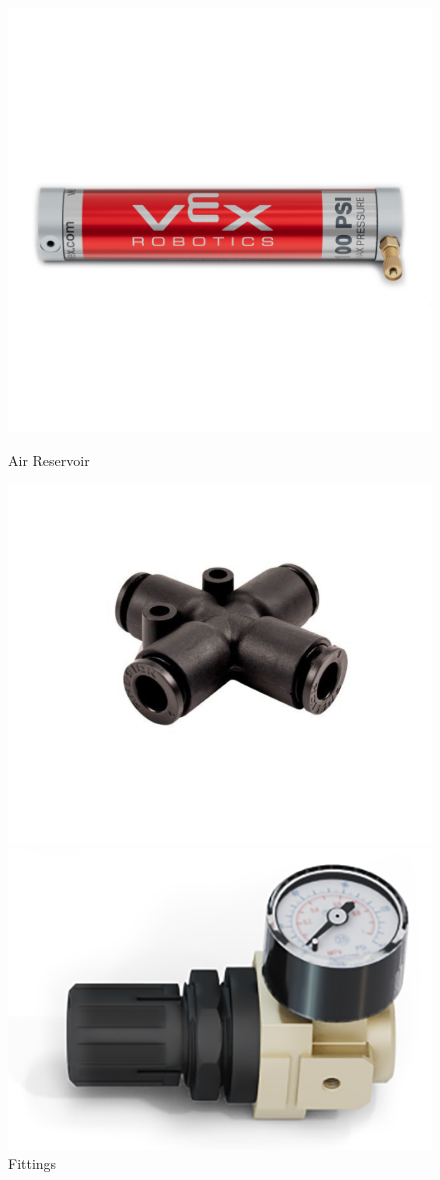 \begin{figure}[hbt!]
\begin{minipage}{.5\textwidth}
        \includegraphics[width=.8\linewidth]{images/Air Resivoir.png}
        \caption{Air Reservoir}
        \label{fig:air-reservoir}
    \end{minipage}
        \begin{minipage}{.5\textwidth}
        \centering
        \includegraphics[width=.8\linewidth]{images/Fittings.jpeg}
        \caption{Fittings}
        \label{fig:fittings}
    \end{minipage}
        \begin{minipage}{.5\textwidth}
        \centering
        \includegraphics[width=.8\linewidth]{images/Pressure Regulator.png}

\end{minipage}
\end{figure}
